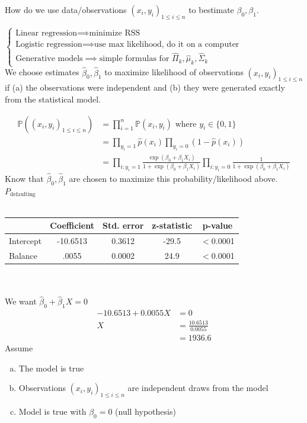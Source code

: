 \documentclass[12pt, letterpaper]{article}
\begin{document}
How do we use data/observations $(x_i,y_i)_{1\le i \le n}$ to bestimate $\beta_0, \beta_1$.

$\begin{cases}
    \text{Linear regression} \implies \text{minimize RSS}\\
    \text{Logistic regression} \implies \text{use max likelihood, do it on a computer} \\ 
    \text{Generative models} \implies \text{simple formulas for } \hat \Pi_k, \hat \mu_k, \hat \Sigma_k
\end{cases}$ \\

\noindent We choose estimates $\hat \beta_0, \hat \beta_1$ to maximize likelihood of observations $(x_i,y_i)_{1\le i \le n}$
if (a) the observations were independent and (b) they were generated exactly from the statistical model.

\begin{align*}
    \mathbb{P}\left((x_i,y_i)_{1\le i \le n}\right) &= \prod_{i=1}^{n} \mathbb{P}(x_i,y_i) \text{ where }y_i \in \{0,1\} \\
    &= \prod_{y_i=1} \hat p (x_i) \prod_{y_i=0} (1- \hat p (x_i))\\
    &= \prod_{i:y_i=1} \frac{\exp(\beta_0+\beta_1X_i)}{1+\exp(\beta_0+\beta_1X_i)}\prod_{i:y_i=0}\frac{1}{1+\exp(\beta_0+\beta_1X_i)}
\end{align*}
Know that $\hat\beta_0, \hat\beta_1$ are chosen to maximize this probability/likelihood above. \\

\noindent {} $P_{\text{defaulting}}$ \\ \\
\begin{tabular}{l | c c c c}
              &  Coefficient & Std. error & z-statistic & p-value \\
              \hline
    Intercept & -10.6513 & 0.3612 & -29.5 & $<$0.0001 \\
    Balance   & .0055 & 0.0002 & 24.9 & $<$0.0001
\end{tabular} \\ \\ 

We want $\hat \beta_0 + \hat \beta_1X = 0$
\begin{align*}
    -10.6513 + 0.0055X &= 0 \\
    X &= \frac{10.6513}{0.0055} \\ 
    &= 1936.6
\end{align*}
Assume \begin{enumerate}[a.]
    \item The model is true 
    \item Observations $(x_i,y_i)_{1\le i\le n}$ are independent draws from the model
    \item Model is true with $\beta_0 = 0$ (null hypothesis)
\end{enumerate}
\end{document}
